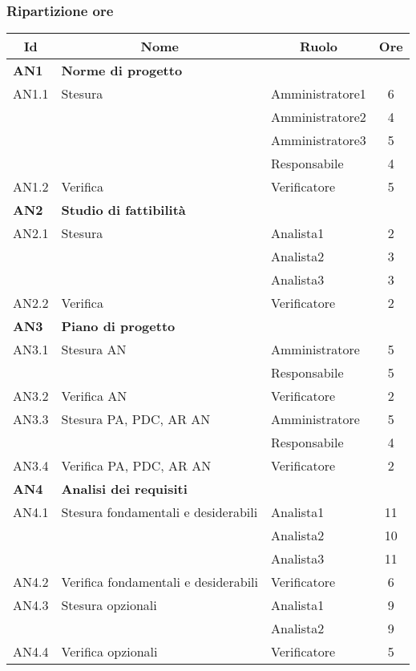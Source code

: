 \subsubsection{Ripartizione ore}

\begin{table}[H]
	\centering
	\begin{tabular}{ l l l c  }
	\hline
	\multicolumn{1}{c}{\textbf{Id}} & 
	\multicolumn{1}{c}{\textbf{Nome}} & 
	\multicolumn{1}{c}{\textbf{Ruolo}}& 
	\multicolumn{1}{c}{\textbf{Ore}} \\
	\hline
	
	\textbf{AN1} & \textbf{Norme di progetto} \\
	\cline{3-4}
	AN1.1 & Stesura & Amministratore1 & 6\\ 
    & & Amministratore2 & 4\\
    & & Amministratore3 & 5 \\
    & & Responsabile & 4 \\
    \cline{3-4}
	AN1.2 & Verifica & Verificatore &  5\\
	
	\hline
	\textbf{AN2} & \textbf{Studio di fattibilità} \\
	\cline{3-4}
	AN2.1 & Stesura & Analista1 & 2\\ 
    & & Analista2 & 3\\
    & & Analista3 & 3 \\
    \cline{3-4}
	AN2.2 & Verifica & Verificatore &  2\\
	
	\hline
	\textbf{AN3} & \textbf{Piano di progetto} \\
	\cline{3-4}
	AN3.1 & Stesura AN & Amministratore & 5\\ 
    & & Responsabile & 5\\
    \cline{3-4}
	AN3.2 & Verifica AN & Verificatore &  2\\
	\cline{3-4}
	AN3.3 & Stesura PA, PDC, AR AN & Amministratore & 5\\ 
    & & Responsabile & 4\\
	\cline{3-4}
	AN3.4 & Verifica PA, PDC, AR AN & Verificatore &  2\\
	
	\hline
	\textbf{AN4} & \textbf{Analisi dei requisiti} \\
	\cline{3-4}
	AN4.1 & Stesura fondamentali e desiderabili & Analista1 & 11\\ 
    & & Analista2 & 10\\
    & & Analista3 & 11\\
    \cline{3-4}
	AN4.2 & Verifica fondamentali e desiderabili & Verificatore &  6\\
	\cline{3-4}
	AN4.3 & Stesura opzionali & Analista1 & 9\\ 
    & & Analista2 & 9\\
	\cline{3-4}
	AN4.4 & Verifica opzionali & Verificatore &  5\\
	

\end{tabular}
\end{table}
